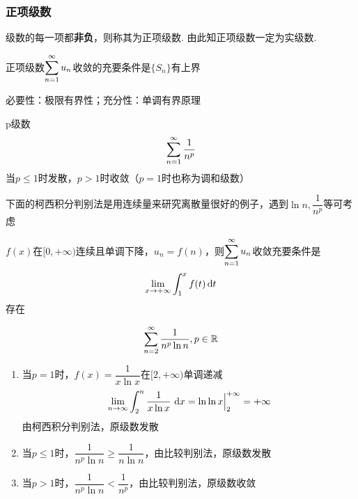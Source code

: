 \subsubsection{正项级数}
\begin{definition}[正项级数]
级数的每一项都\textbf{非负}，则称其为正项级数. 由此知正项级数一定为实级数.
\end{definition}
\begin{theorem}[正项级数收敛的充要条件]
正项级数$\displaystyle\sum_{n=1}^{\infty}u_n$收敛的充要条件是$\{S_n\}$有上界
\end{theorem}
\begin{analysis}
	必要性：极限有界性；充分性：单调有界原理
\end{analysis}
\begin{example}p级数
\[\displaystyle\sum_{n=1}^{\infty}\dfrac{1}{n^p}\]
当$p\leq 1$时发散，$p>1$时收敛（$p=1$时也称为调和级数）
\end{example}
\par 下面的柯西积分判别法是用连续量来研究离散量很好的例子，遇到$\ln n,\dfrac{1}{n^p}$等可考虑
\begin{theorem}[柯西积分判别法]
$f(x)$在$[0,+\infty)$连续且单调下降，$u_n=f(n)$，则$\displaystyle\sum_{n=1}^{\infty}u_n$收敛充要条件是
\[\displaystyle\lim_{x\to+\infty}\int_1^xf(t)\,\mathrm{d} t\]
存在
\end{theorem}
\begin{example}
\[\sum_{n=2}^{\infty}{\dfrac{1}{n^p\ln n}},p\in\mathbb{R}\]
\end{example}
\begin{analysis}
\begin{enumerate}
	\item 当$p=1$时，$f(x)=\dfrac{1}{x\ln x}$在$[2,+\infty)$单调递减
	\[\displaystyle\lim_{n\to\infty}\displaystyle\int_{2}^{n}{\dfrac{1}{x\ln x}}\,\,\mathrm{d} x=\ln\ln x\Big|_2^{+\infty}=+\infty\]
	由柯西积分判别法，原级数发散
	\item 当$p\leq 1$时，$\dfrac{1}{n^p\ln n}\geq\dfrac{1}{n\ln n}$，由比较判别法，原级数发散
	\item 当$p>1$时，$\dfrac{1}{n^p\ln n}<\dfrac{1}{n^p}$，由比较判别法，原级数收敛
\end{enumerate}
\end{analysis}

